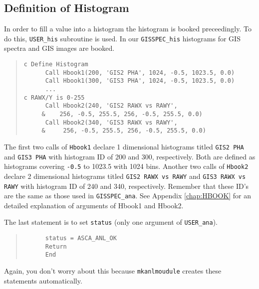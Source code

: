 \subsection{Definition of Histogram}
In order to fill a value into a histogram
the histogram is booked preceedingly.
To do this,
{\tt USER\_his} subroutine is used.
In our {\tt GISSPEC\_his}
histograms for GIS spectra and GIS images are booked.
\begin{quote}\baselineskip 3.2mm\begin{verbatim}
c Define Histogram
      Call Hbook1(200, 'GIS2 PHA', 1024, -0.5, 1023.5, 0.0)
      Call Hbook1(300, 'GIS3 PHA', 1024, -0.5, 1023.5, 0.0)
      ...
c RAWX/Y is 0-255
      Call Hbook2(240, 'GIS2 RAWX vs RAWY',
     &    256, -0.5, 255.5, 256, -0.5, 255.5, 0.0)
      Call Hbook2(340, 'GIS3 RAWX vs RAWY',
     &     256, -0.5, 255.5, 256, -0.5, 255.5, 0.0)
\end{verbatim}\end{quote}
The first two calls of {\tt Hbook1} declare 1 dimensional histograms
titled {\tt GIS2 PHA} and {\tt GIS3 PHA}
with histogram ID of 200 and 300, respectively.
Both are defined as histograms covering {\tt -0.5} to {1023.5} with 1024 bins.
Another two calls of {\tt Hbook2} declare 2 dimensional histograms
titled {\tt GIS2 RAWX vs RAWY} and {\tt GIS3 RAWX vs RAWY}
with histogram ID of 240 and 340, respectively.
Remember that these ID's are the same as those used in {\tt GISSPEC\_ana}.
See Appendix \ref{chap:HBOOK}
for an detailed explanation of arguments of Hbook1 and Hbook2.

The last statement is to set {\tt status}
(only one argument of {\tt USER\_ana}).
\begin{quote}\baselineskip 3.2mm\begin{verbatim}
      status = ASCA_ANL_OK
      Return
      End
\end{verbatim}\end{quote}
Again, you don't worry about this
because {\tt mkanlmoudule} creates these statements automatically.

